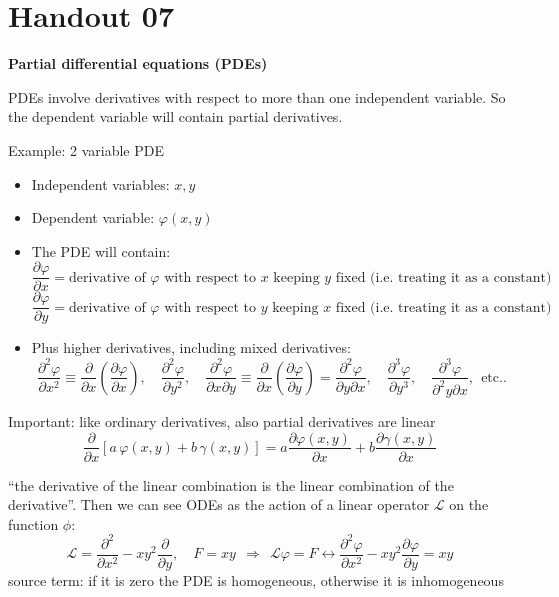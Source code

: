 \documentclass{article}
\begin{document}
\newpage

\section{Handout 07}

\large
\begin{center}
    \textbf{Partial differential equations (PDEs)}
\end{center}

\normalsize
\noindent
PDEs involve derivatives with respect to more than one independent variable. So the dependent variable will contain partial derivatives.

\vspace{2mm}\noindent
Example: 2 variable PDE
\begin{itemize}
    \item Independent variables: $x, y$
    \item Dependent variable: $\varphi(x, y)$
    \item The PDE will contain:
    $$\frac{\partial \varphi}{\partial x} = \text{derivative of $\varphi$ with respect to $x$ keeping $y$ fixed (i.e. treating it as a constant)}$$
    $$\frac{\partial \varphi}{\partial y} = \text{derivative of $\varphi$ with respect to $y$ keeping $x$ fixed (i.e. treating it as a constant)}$$
    \item Plus higher derivatives, including mixed derivatives:
    $$\frac{\partial^2 \varphi}{\partial x^2} \equiv \frac{\partial}{\partial x} \left( \frac{\partial \varphi}{\partial x} \right), \quad
\frac{\partial^2 \varphi}{\partial y^2}, \quad
\frac{\partial^2 \varphi}{\partial x \partial y} \equiv \frac{\partial}{\partial x} \left( \frac{\partial \varphi}{\partial y} \right) =
\frac{\partial^2 \varphi}{\partial y \partial x}, \quad
\frac{\partial^3 \varphi}{\partial y^3}, \quad
\frac{\partial^3 \varphi}{\partial^2 y \partial x}, \ \ \text{etc..}$$
\end{itemize}

\noindent
Important: like ordinary derivatives, also partial derivatives are linear
$$\frac{\partial}{\partial x} \left[ a\, \varphi(x, y) + b\, \gamma(x, y) \right]
= a \frac{\partial \varphi(x, y)}{\partial x} + b \frac{\partial \gamma(x, y)}{\partial x}$$

\noindent
“the derivative of the linear combination is the linear combination of the derivative”. Then we can see ODEs as the action of a linear operator $\mathcal{L}$ on the function $\phi$:
\begin{equation*}
    \mathcal{L} = \frac{\partial^2}{\partial x^2} -xy^2 \frac{\partial}{\partial y}, \quad F=  xy \ \ \Rightarrow \ \ \boxed{\mathcal{L} \varphi = F \longleftrightarrow \frac{\partial^2 \varphi}{\partial x^2} -xy^2\frac{\partial \varphi}{\partial y} = xy}
\end{equation*}
source term: if it is zero the PDE is homogeneous, otherwise it is inhomogeneous
\end{document}

